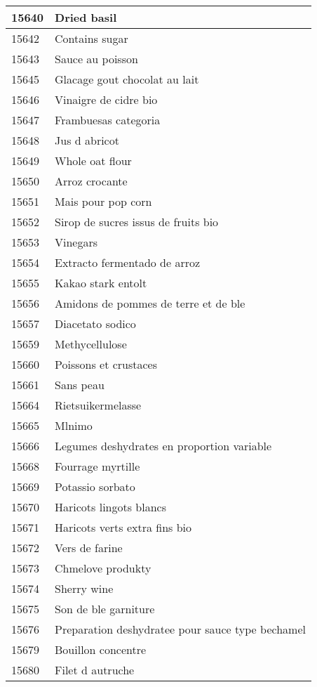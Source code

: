 \begin{longtable}{|l|l|}
15640 & Dried basil \\ \hline 
15642 & Contains sugar \\ \hline 
15643 & Sauce au poisson \\ \hline 
15645 & Glacage gout chocolat au lait \\ \hline 
15646 & Vinaigre de cidre bio \\ \hline 
15647 & Frambuesas categoria \\ \hline 
15648 & Jus d abricot \\ \hline 
15649 & Whole oat flour \\ \hline 
15650 & Arroz crocante \\ \hline 
15651 & Mais pour pop corn \\ \hline 
15652 & Sirop de sucres issus de fruits bio \\ \hline 
15653 & Vinegars \\ \hline 
15654 & Extracto fermentado de arroz \\ \hline 
15655 & Kakao stark entolt \\ \hline 
15656 & Amidons de pommes de terre et de ble \\ \hline 
15657 & Diacetato sodico \\ \hline 
15659 & Methycellulose \\ \hline 
15660 & Poissons et crustaces \\ \hline 
15661 & Sans peau \\ \hline 
15664 & Rietsuikermelasse \\ \hline 
15665 & Mlnimo \\ \hline 
15666 & Legumes deshydrates en proportion variable \\ \hline 
15668 & Fourrage myrtille \\ \hline 
15669 & Potassio sorbato \\ \hline 
15670 & Haricots lingots blancs \\ \hline 
15671 & Haricots verts extra fins bio \\ \hline 
15672 & Vers de farine \\ \hline 
15673 & Chmelove produkty \\ \hline 
15674 & Sherry wine \\ \hline 
15675 & Son de ble garniture \\ \hline 
15676 & Preparation deshydratee pour sauce type bechamel \\ \hline 
15679 & Bouillon concentre \\ \hline 
15680 & Filet d autruche \\ \hline 

\end{longtable}
